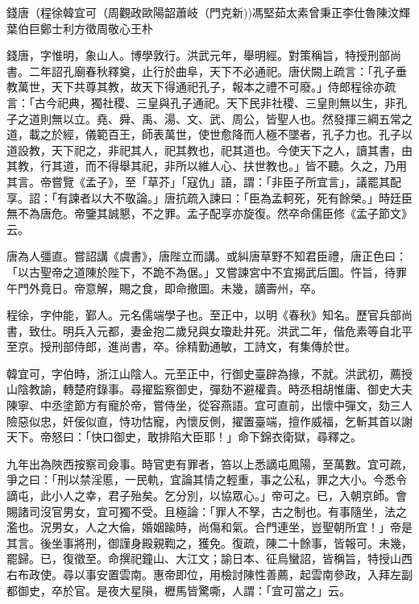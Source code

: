 
\begin{pinyinscope}
錢唐（程徐韓宜可（周觀政歐陽韶蕭岐（門克新))馮堅茹太素曾秉正李仕魯陳汶輝葉伯巨鄭士利方徵周敬心王朴

錢唐，字惟明，象山人。博學敦行。洪武元年，舉明經。對策稱旨，特授刑部尚書。二年詔孔廟春秋釋奠，止行於曲阜，天下不必通祀。唐伏闕上疏言：「孔子垂教萬世，天下共尊其教，故天下得通祀孔子，報本之禮不可廢。」侍郎程徐亦疏言：「古今祀典，獨社稷、三皇與孔子通祀。天下民非社稷、三皇則無以生，非孔子之道則無以立。堯、舜、禹、湯、文、武、周公，皆聖人也。然發揮三綱五常之道，載之於經，儀範百王，師表萬世，使世愈降而人極不墜者，孔子力也。孔子以道設教，天下祀之，非祀其人，祀其教也，祀其道也。今使天下之人，讀其書，由其教，行其道，而不得舉其祀，非所以維人心、扶世教也。」皆不聽。久之，乃用其言。帝嘗覽《孟子》，至「草芥」「寇仇」語，謂：「非臣子所宜言」，議罷其配享。詔：「有諫者以大不敬論。」唐抗疏入諫曰：「臣為孟軻死，死有餘榮。」時廷臣無不為唐危。帝鑒其誠懇，不之罪。孟子配享亦旋復。然卒命儒臣修《孟子節文》云。

唐為人彊直。嘗詔講《虞書》，唐陛立而講。或糾唐草野不知君臣禮，唐正色曰：「以古聖帝之道陳於陛下，不跪不為倨。」又嘗諫宮中不宜揭武后圖。忤旨，待罪午門外竟日。帝意解，賜之食，即命撤圖。未幾，謫壽州，卒。

程徐，字仲能，鄞人。元名儒端學子也。至正中，以明《春秋》知名。歷官兵部尚書，致仕。明兵入元都，妻金抱二歲兒與女瓊赴井死。洪武二年，偕危素等自北平至京。授刑部侍郎，進尚書，卒。徐精勤通敏，工詩文，有集傳於世。

韓宜可，字伯時，浙江山陰人。元至正中，行御史臺辟為掾，不就。洪武初，薦授山陰教諭，轉楚府錄事。尋擢監察御史，彈劾不避權貴。時丞相胡惟庸、御史大夫陳寧、中丞塗節方有寵於帝，嘗侍坐，從容燕語。宜可直前，出懷中彈文，劾三人險惡似忠，奸佞似直，恃功怙寵，內懷反側，擢置臺端，擅作威福，乞斬其首以謝天下。帝怒曰：「快口御史，敢排陷大臣耶！」命下錦衣衛獄，尋釋之。

九年出為陜西按察司僉事。時官吏有罪者，笞以上悉謫屯鳳陽，至萬數。宜可疏，爭之曰：「刑以禁淫慝，一民軌，宜論其情之輕重，事之公私，罪之大小。今悉令謫屯，此小人之幸，君子殆矣。乞分別，以協眾心。」帝可之。已，入朝京師。會賜諸司沒官男女，宜可獨不受。且極論：「罪人不孥，古之制也。有事隨坐，法之濫也。況男女，人之大倫，婚姻踰時，尚傷和氣。合門連坐，豈聖朝所宜！」帝是其言。後坐事將刑，御謹身殿親鞫之，獲免。復疏，陳二十餘事，皆報可。未幾，罷歸。已，復徵至。命撰祀鐘山、大江文；諭日本、征烏蠻詔，皆稱旨，特授山西右布政使。尋以事安置雲南。惠帝即位，用檢討陳性善薦，起雲南參政，入拜左副都御史，卒於官。是夜大星隕，櫪馬皆驚嘶，人謂：「宜可當之」云。


\end{pinyinscope}
